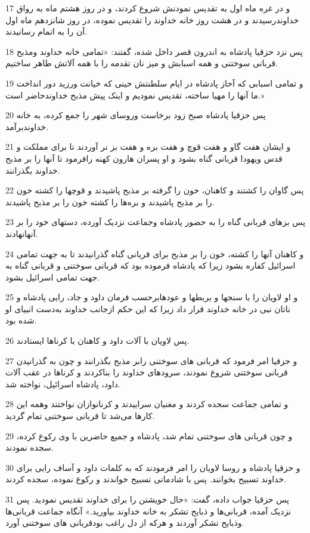 \par 17 و در غره ماه اول به تقدیس نمودنش شروع کردند، و در روز هشتم ماه به رواق خداوندرسیدند و در هشت روز خانه خداوند را تقدیس نموده، در روز شانزدهم ماه اول آن را به اتمام رسانیدند.
\par 18 پس نزد حزقیا پادشاه به اندرون قصر داخل شده، گفتند: «تمامی خانه خداوند ومذبح قربانی سوختنی و همه اسبابش و میز نان تقدمه را با همه آلاتش طاهر ساختیم.
\par 19 و تمامی اسبابی که آحاز پادشاه در ایام سلطنتش حینی که خیانت ورزید دور انداخت ما آنها را مهیا ساخته، تقدیس نمودیم و اینک پیش مذبح خداوندحاضر است.»
\par 20 پس حزقیا پادشاه صبح زود برخاست وروسای شهر را جمع کرده، به خانه خداوندبرآمد.
\par 21 و ایشان هفت گاو و هفت قوچ و هفت بره و هفت بز نر آوردند تا برای مملکت و قدس ویهودا قربانی گناه بشود و او پسران هارون کهنه رافرمود تا آنها را بر مذبح خداوند بگذرانند.
\par 22 پس گاوان را کشتند و کاهنان، خون را گرفته بر مذبح پاشیدند و قوچها را کشته خون را بر مذبح پاشیدند و بره‌ها را کشته خون را بر مذبح پاشیدند.
\par 23 پس بزهای قربانی گناه را به حضور پادشاه وجماعت نزدیک آورده، دستهای خود را بر آنهانهادند.
\par 24 و کاهنان آنها را کشته، خون را بر مذبح برای قربانی گناه گذرانیدند تا به جهت تمامی اسرائیل کفاره بشود زیرا که پادشاه فرموده بود که قربانی سوختنی و قربانی گناه به جهت تمامی اسرائیل بشود.
\par 25 و او لاویان را با سنجها و بربطها و عودهابرحسب فرمان داود و جاد، رایی پادشاه و ناتان نبی در خانه خداوند قرار داد زیرا که این حکم ازجانب خداوند به‌دست انبیای او شده بود.
\par 26 پس لاویان با آلات داود و کاهنان با کرناها ایستادند.
\par 27 و حزقیا امر فرمود که قربانی های سوختنی رابر مذبح بگذرانند و چون به گذرانیدن قربانی سوختنی شروع نمودند، سرودهای خداوند را بناکردند و کرناها در عقب آلات داود، پادشاه اسرائیل، نواخته شد.
\par 28 و تمامی جماعت سجده کردند و مغنیان سراییدند و کرنانوازان نواختند وهمه این کارها می‌شد تا قربانی سوختنی تمام گردید.
\par 29 و چون قربانی های سوختنی تمام شد، پادشاه و جمیع حاضرین با وی رکوع کرده، سجده نمودند.
\par 30 و حزقیا پادشاه و روسا لاویان را امر فرمودند که به کلمات داود و آساف رایی برای خداوند تسبیح بخوانند. پس با شادمانی تسبیح خواندند و رکوع نموده، سجده کردند.
\par 31 پس حزقیا جواب داده، گفت: «حال خویشتن را برای خداوند تقدیس نمودید. پس نزدیک آمده، قربانی‌ها و ذبایح تشکر به خانه خداوند بیاورید.» آنگاه جماعت قربانی‌ها وذبایح تشکر آوردند و هر‌که از دل راغب بودقربانی های سوختنی آورد.
